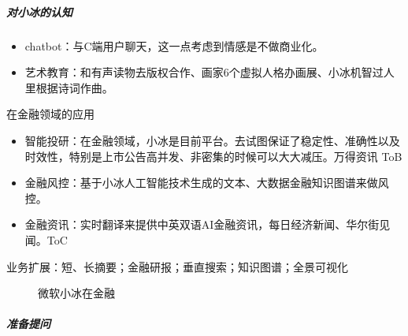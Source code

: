\documentclass[letterpaper,10pt,english]{sphinxmanual}
\begin{document}
\subparagraph{对小冰的认知}
\label{\detokenize{chapter_interview/simulate_interview:id9}}\begin{itemize}
\item {} 
chatbot：与C端用户聊天，这一点考虑到情感是不做商业化。

\item {} 
艺术教育：和有声读物去版权合作、画家6个虚拟人格办画展、小冰机智过人里根据诗词作曲。

\end{itemize}

在金融领域的应用
\begin{itemize}
\item {} 
智能投研：在金融领域，小冰是目前平台。去试图保证了稳定性、准确性以及时效性，特别是上市公告高并发、非密集的时候可以大大减压。万得资讯
ToB

\item {} 
金融风控：基于小冰人工智能技术生成的文本、大数据金融知识图谱来做风控。

\item {} 
金融资讯：实时翻译来提供中英双语AI金融资讯，每日经济新闻、华尔街见闻。ToC

\end{itemize}

业务扩展：短、长摘要；金融研报；垂直搜索；知识图谱；全景可视化

\begin{figure}[H]
\centering
\capstart

\noindent{}
\caption{微软小冰在金融\sphinxfootnotemark[879]}\label{\detokenize{chapter_interview/simulate_interview:id15}}\end{figure}
%
\begin{footnotetext}[879]\sphinxAtStartFootnote
{}
%
\end{footnotetext}\ignorespaces 
{}


\subparagraph{准备提问}
\label{\detokenize{chapter_interview/simulate_interview:id10}}
\end{document}
